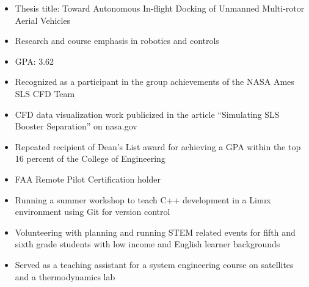 
\begin{itemize}
  \item Thesis title: Toward Autonomous In-flight Docking of Unmanned Multi-rotor Aerial Vehicles
  \item Research and course emphasis in robotics and controls
  \item GPA: 3.62
\end{itemize}
\divider

\medskip
{}

\par\medskip
{}
\par\medskip
{}

\begin{itemize}
    \item Recognized as a participant in the group achievements of the NASA Ames SLS CFD Team
    \item CFD data visualization work publicized in the article “Simulating SLS Booster Separation” on nasa.gov
    \item Repeated recipient of Dean’s List award for achieving a GPA within the top 16 percent of the College of Engineering
\end{itemize}

\begin{itemize}
    \item FAA Remote Pilot Certification holder
    \item Running a summer workshop to teach C++ development in a Linux environment using Git for version control
    \item Volunteering with planning and running STEM related events for fifth and sixth grade students with low income and English learner backgrounds 
    \item Served as a teaching assistant for a system engineering course on satellites and a thermodynamics lab
\end{itemize}
